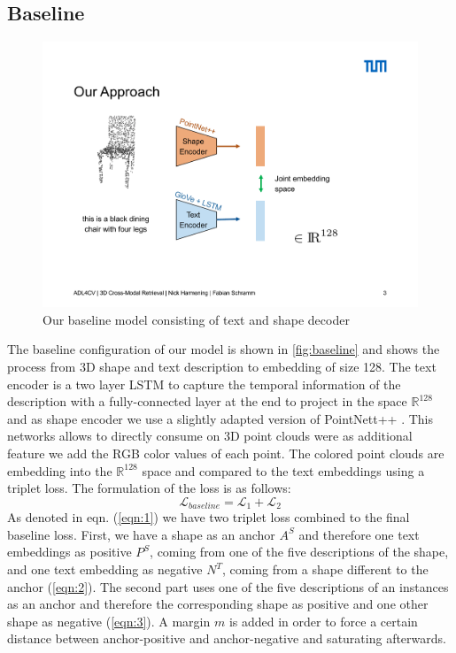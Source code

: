 \documentclass[10pt,twocolumn,letterpaper]{article}
\begin{document}
\subsection{Baseline}
\begin{figure}[t]%
	\centering
	\includegraphics[width=0.8\linewidth]{fig3.pdf}
	\caption[]{Our baseline model consisting of text and shape decoder}
	\label{fig:baseline}
\end{figure}
The baseline configuration of our model is shown in \autoref{fig:baseline} and shows the process from 3D shape and text description to embedding of size 128. The text encoder is a two layer LSTM to capture the temporal information of the description with a fully-connected layer at the end to project in the space $\mathbb{R}^{128}$ and as shape encoder we use a slightly adapted version of PointNett++ \cite{qi2017Pointnet++}. This networks allows to directly consume on 3D point clouds were as additional feature we add the RGB color values of each point. The colored point clouds are embedding into the $\mathbb{R}^{128}$ space and compared to the text embeddings using a triplet loss. The formulation of the loss is as follows:
\begin{equation}
\label{eqn:1}
\mathcal{L}_{baseline} = \mathcal{L}_{1} + \mathcal{L}_{2}
\end{equation}
As denoted in eqn. (\ref{eqn:1}) we have two triplet loss combined to the final baseline loss. First, we have a shape as an anchor $A^S$ and therefore one text embeddings as positive $P^S$, coming from one of the five descriptions of the shape, and one text embedding as negative $N^T$, coming from a shape different to the anchor (\ref{eqn:2}). The second part uses one of the five descriptions of an instances as an anchor and therefore the corresponding shape as positive and one other shape as negative (\ref{eqn:3}). A margin $m$ is added in order to force a certain distance between anchor-positive and anchor-negative and saturating afterwards. 
\end{document}
